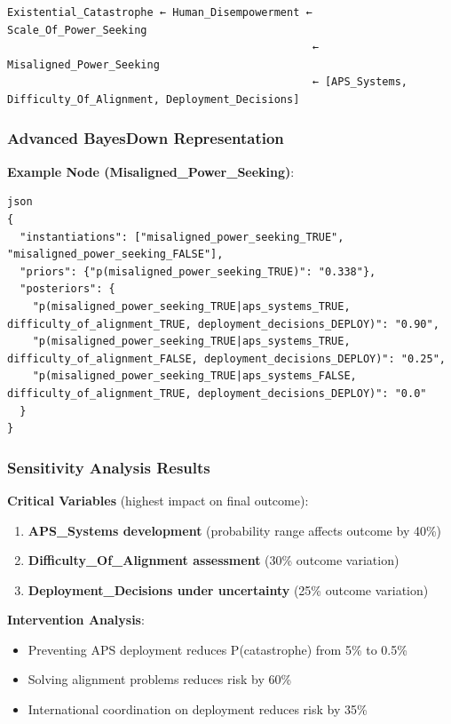 \documentclass[
  11pt,
  letterpaper,
]{book}
\providecommand{\tightlist}{%
  \setlength{\itemsep}{0pt}\setlength{\parskip}{0pt}}
\begin{document}
\begin{verbatim}
Existential_Catastrophe ← Human_Disempowerment ← Scale_Of_Power_Seeking
                                                ← Misaligned_Power_Seeking
                                                ← [APS_Systems, Difficulty_Of_Alignment, Deployment_Decisions]
\end{verbatim}

\subsubsection{Advanced BayesDown
Representation}\label{sec-carlsmith-bayesdown}

\textbf{Example Node (Misaligned\_Power\_Seeking)}:

\begin{verbatim}
json
{
  "instantiations": ["misaligned_power_seeking_TRUE", "misaligned_power_seeking_FALSE"],
  "priors": {"p(misaligned_power_seeking_TRUE)": "0.338"},
  "posteriors": {
    "p(misaligned_power_seeking_TRUE|aps_systems_TRUE, difficulty_of_alignment_TRUE, deployment_decisions_DEPLOY)": "0.90",
    "p(misaligned_power_seeking_TRUE|aps_systems_TRUE, difficulty_of_alignment_FALSE, deployment_decisions_DEPLOY)": "0.25",
    "p(misaligned_power_seeking_TRUE|aps_systems_FALSE, difficulty_of_alignment_TRUE, deployment_decisions_DEPLOY)": "0.0"
  }
}
\end{verbatim}

\subsubsection{Sensitivity Analysis
Results}\label{sec-carlsmith-sensitivity}

\textbf{Critical Variables} (highest impact on final outcome):

\begin{enumerate}
\def\labelenumi{\arabic{enumi}.}
\tightlist
\item
  \textbf{APS\_Systems development} (probability range affects outcome
  by 40\%)
\item
  \textbf{Difficulty\_Of\_Alignment assessment} (30\% outcome variation)
\item
  \textbf{Deployment\_Decisions under uncertainty} (25\% outcome
  variation)
\end{enumerate}

\textbf{Intervention Analysis}:

\begin{itemize}
\tightlist
\item
  Preventing APS deployment reduces P(catastrophe) from 5\% to 0.5\%
\item
  Solving alignment problems reduces risk by 60\%
\item
  International coordination on deployment reduces risk by 35\%
\end{itemize}
\end{document}
